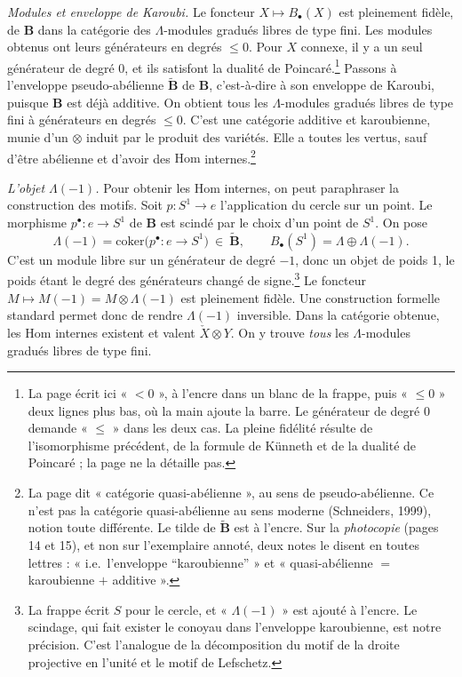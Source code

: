 \documentclass[11pt,a4paper]{article}
\begin{document}
\emph{Modules et enveloppe de Karoubi.} Le foncteur $X \mapsto B_\bullet(X)$
est pleinement fidèle, de $\mathbf{B}$ dans la catégorie des
$\Lambda$-modules gradués libres de type fini. Les modules obtenus ont leurs
générateurs en degrés $\leq 0$. Pour $X$ connexe, il y a un seul générateur de
degré 0, et ils satisfont la dualité de Poincaré.\footnote{La page écrit ici
« $< 0$ », à l'encre dans un blanc de la frappe, puis « $\leq 0$ » deux lignes
plus bas, où la main ajoute la barre. Le générateur de degré 0 demande
« $\leq$ » dans les deux cas. La pleine fidélité
résulte de l'isomorphisme précédent, de la formule de Künneth et de la dualité
de Poincaré ; la page ne la détaille pas.} Passons à l'enveloppe
pseudo-abélienne $\widetilde{\mathbf{B}}$ de $\mathbf{B}$, c'est-à-dire à son
enveloppe de Karoubi, puisque $\mathbf{B}$ est déjà additive. On obtient tous
les $\Lambda$-modules gradués libres de type fini à générateurs en degrés $\leq
0$. C'est une catégorie additive et karoubienne, munie d'un $\otimes$ induit par
le produit des variétés. Elle a toutes les vertus, sauf d'être abélienne et
d'avoir des $\mathrm{Hom}$ internes.\footnote{La page dit « catégorie
quasi-abélienne », au sens de pseudo-abélienne. Ce n'est pas la catégorie
quasi-abélienne au sens moderne (Schneiders, 1999), notion toute différente.
Le tilde de $\widetilde{\mathbf{B}}$ est à l'encre. Sur la \emph{photocopie}
(pages 14 et 15), et non sur l'exemplaire annoté, deux notes le disent en
toutes lettres : « i.e.\ l'enveloppe “karoubienne” » et « quasi-abélienne $=$
karoubienne $+$ additive ».}

\emph{L'objet $\Lambda(-1)$.} Pour obtenir les $\mathrm{Hom}$ internes, on peut
paraphraser la construction des motifs. Soit $p : S^{1} \to e$ l'application du
cercle sur un point. Le morphisme $p^{\bullet} : e \to S^{1}$ de $\mathbf{B}$
est scindé par le choix d'un point de $S^{1}$. On pose
\[
\Lambda(-1) = \mathrm{coker}\big(p^{\bullet} : e \to S^{1}\big)
\ \in\ \widetilde{\mathbf{B}},
\qquad
B_\bullet(S^{1}) = \Lambda \oplus \Lambda(-1).
\]
C'est un module libre sur un générateur de degré $-1$, donc un objet de poids
1, le poids étant le degré des générateurs changé de signe.\footnote{La frappe
écrit $S$ pour le cercle, et « $\Lambda(-1)$ » est ajouté à l'encre. Le
scindage, qui fait exister le conoyau dans l'enveloppe karoubienne, est notre
précision. C'est l'analogue de la décomposition du motif de la droite
projective en l'unité et le motif de Lefschetz.} Le foncteur $M \mapsto M(-1) =
M \otimes \Lambda(-1)$ est pleinement fidèle. Une construction formelle
standard permet donc de rendre $\Lambda(-1)$ inversible. Dans la catégorie
obtenue, les $\mathrm{Hom}$ internes existent et valent $\check{X} \otimes Y$.
On y trouve \emph{tous} les $\Lambda$-modules gradués libres de type fini.
\end{document}
